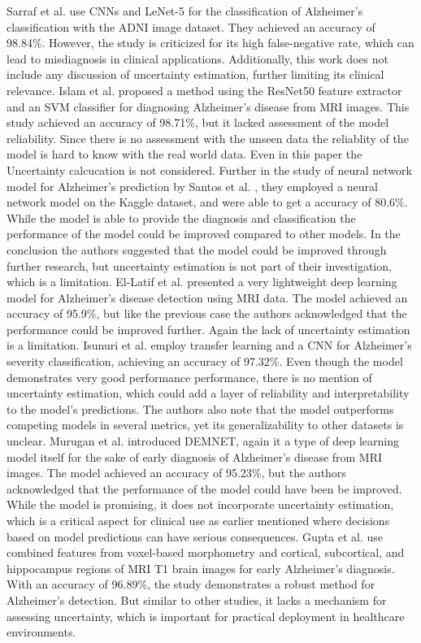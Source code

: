 \documentclass[12pt,onecolumn]{report}
\begin{document}
Sarraf et al. \cite{sarraf2016} use CNNs and LeNet-5 for the classification of Alzheimer’s classification with the ADNI image dataset. They achieved an accuracy of 98.84\%. However, the study is criticized for its high false-negative rate, which can lead to misdiagnosis in clinical applications. Additionally, this work does not include any discussion of uncertainty estimation, further limiting its clinical relevance. Islam et al. \cite{Islam2023} proposed a method using the ResNet50 feature extractor and an SVM classifier for diagnosing Alzheimer’s disease from MRI images. This study achieved an accuracy of 98.71\%, but it lacked assessment of the model reliability. Since there is no assessment with the unseen data the reliablity of the model is hard to know with the real world data. Even in this paper the Uncertainty calcucation is not considered. Further in the study of neural network model for Alzheimer’s prediction by Santos et al. \cite{Santos2023}, they employed a neural network model on  the Kaggle dataset, and were able to get a accuracy of 80.6\%. While the model is able to provide the diagnosis and classification the performance of the model could be improved compared to other models. In the conclusion the authors suggested that the model could be improved through further research, but uncertainty estimation is not part of their investigation, which is a limitation. El-Latif et al. \cite{Latif2023} presented a very lightweight deep learning model for Alzheimer’s disease detection using MRI data. The model achieved an accuracy of 95.9\%, but like the previous case the authors acknowledged that the performance could be improved further. Again the lack of uncertainty estimation is a limitation. Isunuri et al. \cite{Isunuri2023} employ transfer learning and a CNN for Alzheimer’s severity classification, achieving an accuracy of 97.32\%. Even though the model demonstrates very good performance performance, there is no mention of uncertainty estimation, which could add a layer of reliability and interpretability to the model’s predictions. The authors also note that the model outperforms competing models in several metrics, yet its generalizability to other datasets is unclear.
Murugan et al. \cite{Murugan2021} introduced DEMNET, again it a type of deep learning model itself for the sake of early diagnosis of Alzheimer’s disease from MRI images. The model achieved an accuracy of 95.23\%, but the authors acknowledged that the performance of the model could have been be improved. While the model is promising, it does not incorporate uncertainty estimation, which is a critical aspect for clinical use as earlier mentioned where decisions based on model predictions can have serious consequences. Gupta et al. \cite{Gupta2019} use combined features from voxel-based morphometry and cortical, subcortical, and hippocampus regions of MRI T1 brain images for early Alzheimer’s diagnosis. With an accuracy of 96.89\%, the study demonstrates a robust method for Alzheimer’s detection. But similar to other studies, it lacks a mechanism for assessing uncertainty, which is important for practical deployment in healthcare environments.
\end{document}
